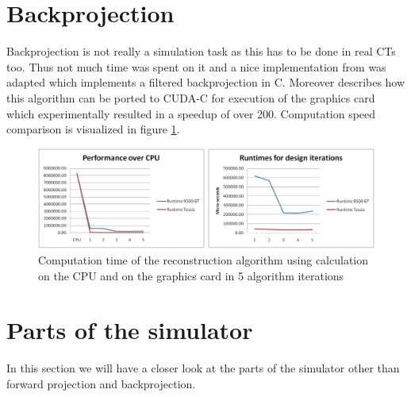 \section{Backprojection}
\par Backprojection is not really a simulation task as this has to be done in real CTs too. Thus not much time was spent on it and a nice implementation from \cite{CUDABackprojection} was adapted which implements a filtered backprojection in C. Moreover \cite{CUDABackprojection} describes how this algorithm can be ported to CUDA-C for execution of the graphics card which experimentally resulted in a speedup of over 200. Computation speed comparison is visualized in figure \ref{ArnesenSpeedup}.
\begin{figure}[h]
	\centering
	\includegraphics[width=\linewidth]{images/ArnesenSpeedupCombined.png}
	\caption{Computation time of the reconstruction algorithm using calculation on the CPU and on the graphics card in 5 algorithm iterations\cite{CUDABackprojection}}
	\label{ArnesenSpeedup}
\end{figure}
\section{Parts of the simulator}
\par In this section we will have a closer look at the parts of the simulator other than forward projection and backprojection.
